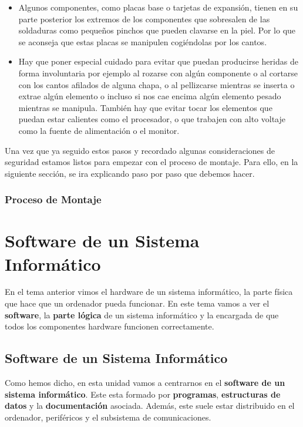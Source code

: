 \begin{enumerate}
\begin{itemize}
        \item Algunos componentes, como placas base o tarjetas de expansión, tienen en su parte posterior los extremos de los componentes que sobresalen de las soldaduras como pequeños pinchos que pueden clavarse en la piel. Por lo que se aconseja que estas placas se manipulen cogiéndolas por los cantos.

        \item Hay que poner especial cuidado para evitar que puedan producirse heridas de forma involuntaria por ejemplo al rozarse con algún componente o al cortarse con los cantos afilados de alguna chapa, o al pellizcarse mientras se inserta o extrae algún elemento o incluso si nos cae encima algún elemento pesado mientras se manipula. También hay que evitar tocar los elementos que puedan estar calientes como el procesador, o que trabajen con alto voltaje como la fuente de alimentación o el monitor.
    \end{itemize}
\end{enumerate}

Una vez que ya seguido estos pasos y recordado algunas consideraciones de seguridad estamos listos para empezar con el proceso de montaje. Para ello, en la siguiente sección, se ira explicando paso por paso que debemos hacer.

\subsection{Proceso de Montaje}





\chapter{Software de un Sistema Informático}
En el tema anterior vimos el hardware de un sistema informático, la parte física que hace que un ordenador pueda funcionar. En este tema vamos a ver el \textbf{software}, la \textbf{parte lógica} de un sistema informático y la encargada de que todos los componentes hardware funcionen correctamente.

\section{Software de un Sistema Informático}
Como hemos dicho, en esta unidad vamos a centrarnos en el \textbf{software de un sistema informático}. Este esta formado por \textbf{programas}, \textbf{estructuras de datos} y la \textbf{documentación} asociada. Además, este suele estar distribuido en el ordenador, periféricos y el subsistema de comunicaciones.


